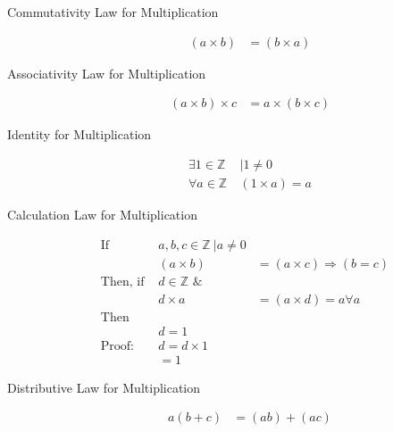 \begin{description}
  \item[Commutativity Law for Multiplication]
  \begin{align}
    (a \times b) & = (b \times a)
  \end{align}
  
  \item[Associativity Law for Multiplication]
  \begin{align}
    (a \times b) \times c & = a \times (b \times c)
  \end{align}
  
  \item[Identity for Multiplication]
  \begin{align}
    \exists 1 \in \mathbb{Z} & ~ | 1 \neq 0 \\
    \forall a \in \mathbb{Z} & ~ (1 \times a) = a
  \end{align}
  
  \item[Calculation Law for Multiplication]
  \begin{align}
  \text{If }       & a, b, c \in \mathbb{Z} ~ | a \neq 0 \\
                   & (a \times b)     & = (a \times c) \Rightarrow (b = c) & \\
  \text{Then, if } & d \in \mathbb{Z} \text{ \& } && \\
                   & d \times a       & = (a \times d) = a \forall a & \\
  \text{Then }     &&                 & \nonumber \\
                   & d = 1            && \\
  \text{Proof: }   & d = d \times 1   && \\
                   &   = 1            &&
  \end{align}
  \item[Distributive Law for Multiplication]
  \begin{align}
    a(b+c) & = (ab) + (ac)
  \end{align}
\end{description}

